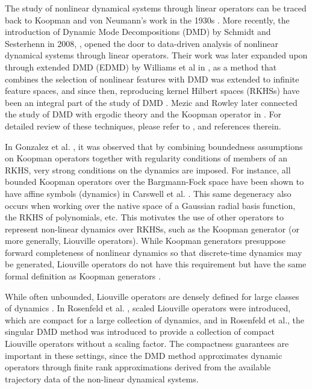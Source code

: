 \documentclass[preprint,12pt]{elsarticle} %
\theoremstyle{plain}
\theoremstyle{definition}
\theoremstyle{remark}
\begin{document}
The study of nonlinear dynamical systems through linear operators can be traced back to Koopman and von Neumann's work in the 1930s \cite{koopman1931hamiltonian, koopman1932dynamical}. More recently, the introduction of Dynamic Mode Decompositions (DMD) by Schmidt and Sesterhenn in 2008, \cite{schmid2010dynamic}, opened the door to data-driven analysis of nonlinear dynamical systems through linear operators. Their work was later expanded upon through extended DMD (EDMD) by Williams et al in \cite{williams2015data}, as a method that combines the selection of nonlinear features with DMD was extended to infinite feature spaces, and since then, reproducing kernel Hilbert spaces (RKHSs) have been an integral part of the study of DMD . Mezic and Rowley later connected the study of DMD with ergodic theory and the Koopman operator in \cite{budivsic2012applied, mezic2020spectrum, williams2014kernel}. For detailed review of these techniques, please refer to \cite{brunton2022modern, colbrook2024multiverse}, and references therein.

In Gonzalez et al. \cite{gonzalez2024kernel}, it was observed that by combining boundedness assumptions on Koopman operators together with regularity conditions of members of an RKHS, very strong conditions on the dynamics are imposed. For instance, all bounded Koopman operators over the Bargmann-Fock space have been shown to have affine symbols (dynamics) in Carswell et al. \cite{carswell2003composition}. This same degeneracy also occurs when working over the native space of a Gaussian radial basis function, the RKHS of polynomials, etc. This motivates the use of other operators to represent non-linear dynamics over RKHSs, such as the Koopman generator (or more generally, Liouville operators). While Koopman generators presuppose forward completeness of nonlinear dynamics so that discrete-time dynamics may be generated, Liouville operators do not have this requirement but have the same formal definition as Koopman generators \cite{rosenfeld2023singular}.

While often unbounded, Liouville operators are densely defined for large classes of dynamics \cite{rosenfeld2024occupation}. In Rosenfeld et al. \cite{rosenfeld2023singular}, scaled Liouville operators were introduced, which are compact for a large collection of dynamics, and in Rosenfeld et al., the singular DMD method was introduced to provide a collection of compact Liouville operators without a scaling factor. The compactness guarantees are important in these settings, since the DMD method approximates dynamic operators through finite rank approximations derived from the available trajectory data of the non-linear dynamical systems.
\end{document}
